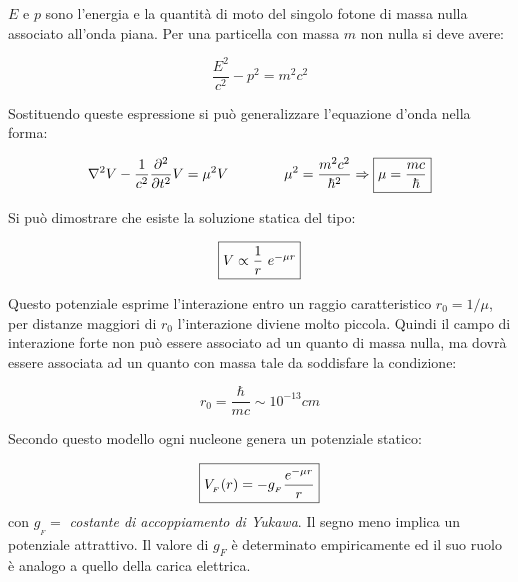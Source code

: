 $E$ e $p$ sono l'energia e la quantità di moto del singolo fotone di massa nulla
associato all'onda piana. Per una particella con massa $m$ non nulla si deve
avere:

\begin{equation*}
\dfrac{E^2}{c^2} - p^2 = m^2 c^2
\end{equation*}

Sostituendo queste espressione si può generalizzare l'equazione d'onda nella forma:

\begin{equation*}
\nabla^2 V - \dfrac{1}{c^2} \dfrac{\partial^2}{\partial t^2} V = \mu^2 V \qquad \qquad
\mu^2 = \dfrac{m^2 c^2}{\hbar^2} \Rightarrow \fbox{$\mu=\dfrac{mc}{\hbar}$}
\end{equation*}

Si può dimostrare che esiste la soluzione statica del tipo:

\begin{equation*}
\fbox{$V \propto \dfrac{1}{r} \ e^{-\mu r}$}
\end{equation*}

Questo potenziale esprime l'interazione entro un raggio caratteristico
$r_0=1/\mu$, per distanze maggiori di $r_0$ l'interazione diviene molto piccola.
Quindi il campo di interazione forte non può essere associato ad un quanto di
massa nulla, ma dovrà essere associata ad un quanto con massa tale da soddisfare
la condizione:

\begin{equation*}
r_0=\dfrac{\hbar}{mc} \sim 10^{-13} cm 
\end{equation*}

Secondo questo modello ogni nucleone genera un potenziale statico:

\begin{equation*}
\fbox{$V_{_F}(r) = - g_{_F} \dfrac{e^{-\mu r}}{r}$}
\end{equation*}
con $g_{_F} =$ \textit{costante
di accoppiamento di Yukawa}. Il segno meno implica un potenziale attrattivo. Il
valore di $g_F$ è determinato empiricamente ed il suo ruolo è analogo a quello
della carica elettrica.

